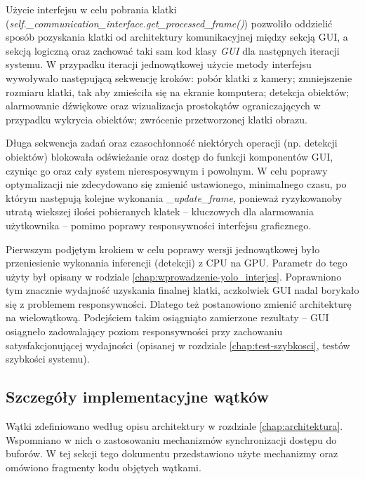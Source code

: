 Użycie interfejsu w celu pobrania klatki (\emph{self.\_communication\_interface.get\_processed\_frame()}) pozwoliło oddzielić sposób pozyskania klatki od architektury komunikacyjnej między sekcją GUI, a sekcją logiczną oraz zachować taki sam kod klasy \emph{GUI} dla następnych iteracji systemu. W przypadku iteracji jednowątkowej użycie metody interfejsu wywoływało następującą sekwencję kroków: pobór klatki z kamery; zmniejszenie rozmiaru klatki, tak aby zmieściła się na ekranie komputera; detekcja obiektów; alarmowanie dźwiękowe oraz wizualizacja prostokątów ograniczających w przypadku wykrycia obiektów; zwrócenie przetworzonej klatki obrazu.

Długa sekwencja zadań oraz czasochłonność niektórych operacji (np. detekcji obiektów) blokowała odświeżanie oraz dostęp do funkcji komponentów GUI, czyniąc go oraz cały system nieresposywnym i powolnym. W celu poprawy optymalizacji nie zdecydowano się zmienić ustawionego, minimalnego czasu, po którym następują kolejne wykonania \emph{\_update\_frame}, ponieważ ryzykowanoby utratą wiekszej ilości pobieranych klatek -- kluczowych dla alarmowania użytkownika -- pomimo poprawy responsywności interfejsu graficznego.

Pierwszym podjętym krokiem w celu poprawy wersji jednowątkowej było przeniesienie wykonania inferencji (detekcji) z CPU na GPU. Parametr do tego użyty był opisany w rodziale \ref{chap:wprowadzenie-yolo_interjes}. Poprawniono tym znacznie wydajność uzyskania finalnej klatki, aczkolwiek GUI nadal borykało się z problemem responsywności. Dlatego też postanowiono zmienić architekturę na wielowątkową. Podejściem takim osiągniąto zamierzone rezultaty -- GUI osiągneło zadowalający poziom responsywności przy zachowaniu satysfakcjonującej wydajności (opisanej w rozdziale \ref{chap:test-szybkosci}, testów szybkości systemu).







\subsection{Szczegóły implementacyjne wątków}
Wątki zdefiniowano według opisu architektury w rozdziale \ref{chap:architektura}. Wspomniano w nich o zastosowaniu mechanizmów synchronizacji dostępu do buforów. W tej sekcji tego dokumentu przedstawiono użyte mechanizmy oraz omówiono fragmenty kodu objętych wątkami.

